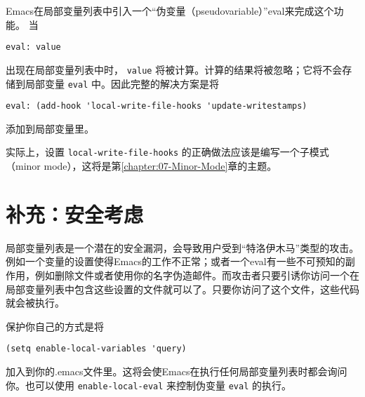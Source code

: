 Emacs在局部变量列表中引入一个“伪变量（pseudovariable）”eval来完成这个功能。
当

\begin{verbatim}
eval: value
\end{verbatim}

出现在局部变量列表中时， \texttt{value} 将被计算。计算的结果将被忽略；它将不会存储到局部变量 \texttt{eval} 中。因此完整的解决方案是将

\begin{verbatim}
eval: (add-hook 'local-write-file-hooks 'update-writestamps)
\end{verbatim}

添加到局部变量里。

实际上，设置 \texttt{local-write-file-hooks} 的正确做法应该是编写一个子模式（minor mode），这将是第\ref{chapter:07-Minor-Mode}章的主题。

\section{补充：安全考虑}
\label{section:05-Addendum-Security-Consideration}

局部变量列表是一个潜在的安全漏洞，会导致用户受到“特洛伊木马”类型的攻击。例如一个变量的设置使得Emacs的工作不正常；或者一个eval有一些不可预知的副作用，例如删除文件或者使用你的名字伪造邮件。而攻击者只要引诱你访问一个在局部变量列表中包含这些设置的文件就可以了。只要你访问了这个文件，这些代码就会被执行。

保护你自己的方式是将

\begin{verbatim}
(setq enable-local-variables 'query)
\end{verbatim}

加入到你的.emacs文件里。这将会使Emacs在执行任何局部变量列表时都会询问你。也可以使用 \texttt{enable-local-eval} 来控制伪变量 \texttt{eval} 的执行。
